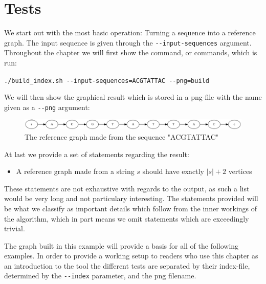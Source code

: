 \documentclass[thesis.tex]{subfiles}
\begin{document}
\section{Tests}
We start out with the most basic operation: Turning a sequence into a reference graph. The input sequence is given through the \texttt{-{}-input-sequences} argument. Throughout the chapter we will first show the command, or commands, which is run:\\
\par\noindent
\texttt{./build\_index.sh -{}-input-sequences=ACGTATTAC -{}-png=build}\\
\par\noindent
We will then show the graphical result which is stored in a png-file with the name given as a \texttt{-{}-png} argument:\\
\begin{figure}[!h]
  \begin{mdframed}
    \includegraphics[width=\textwidth]{output/build.png} 
  \end{mdframed}
  \caption[A reference graph made from the sequence ``ACGTATTAC'']{The reference graph made from the sequence "ACGTATTAC"}
  \label{fig:validation_ref}
\end{figure}
\par\noindent
At last we provide a set of statements regarding the result:
\begin{itemize}
\item A reference graph made from a string $s$ should have exactly $|s|+2$ vertices
\end{itemize}
These statements are not exhaustive with regards to the output, as such a list would be very long and not particulary interesting. The statements provided will be what we classify as important details which follow from the inner workings of the algorithm, which in part means we omit statements which are exceedingly trivial.\\
\par\noindent
The graph built in this example will provide a basis for all of the following examples. In order to provide a working setup to readers who use this chapter as an introduction to the tool the different tests are separated by their index-file, determined by the \texttt{-{}-index} parameter, and the png filename.
\end{document}
